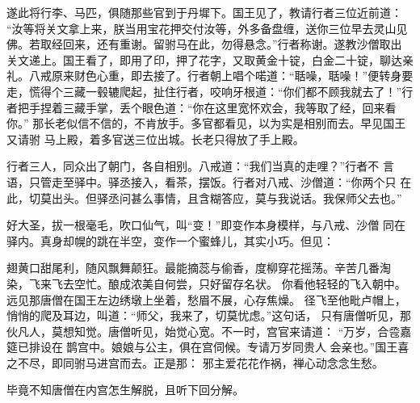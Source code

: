 遂此将行李、马匹，俱随那些官到于丹墀下。国王见了，教请行者三位近前道：
“汝等将关文拿上来，朕当用宝花押交付汝等，外多备盘缠，送你三位早去灵山见
佛。若取经回来，还有重谢。留驸马在此，勿得悬念。”行者称谢。遂教沙僧取出
关文递上。国王看了，即用了印，押了花字，又取黄金十锭，白金二十锭，聊达亲
礼。八戒原来财色心重，即去接了。行者朝上唱个喏道：“聒噪，聒噪！”便转身要
走，慌得个三藏一毂辘爬起，扯住行者，咬响牙根道：“你们都不顾我就去了！”行
者把手捏着三藏手掌，丢个眼色道：“你在这里宽怀欢会，我等取了经，回来看你。”
那长老似信不信的，不肯放手。多官都看见，以为实是相别而去。早见国王又请驸
马上殿，着多官送三位出城。长老只得放了手上殿。

行者三人，同众出了朝门，各自相别。八戒道：“我们当真的走哩？”行者不
言语，只管走至驿中。驿丞接入，看茶，摆饭。行者对八戒、沙僧道：“你两个只
在此，切莫出头。但驿丞问甚么事情，且含糊答应，莫与我说话。我保师父去也。”

好大圣，拔一根毫毛，吹口仙气，叫“变！”即变作本身模样，与八戒、沙僧
同在驿内。真身却幌的跳在半空，变作一个蜜蜂儿，其实小巧。但见：

翅黄口甜尾利，随风飘舞颠狂。最能摘蕊与偷香，度柳穿花摇荡。辛苦几番淘
染，飞来飞去空忙。酿成浓美自何尝，只好留存名状。
你看他轻轻的飞入朝中。远见那唐僧在国王左边绣墩上坐着，愁眉不展，心存焦燥。
径飞至他毗卢帽上，悄悄的爬及耳边，叫道：“师父，我来了，切莫忧虑。”这句话，
只有唐僧听见，那伙凡人，莫想知觉。唐僧听见，始觉心宽。不一时，宫官来请道：
“万岁，合卺嘉筵已排设在鹊宫中。娘娘与公主，俱在宫伺候。专请万岁同贵人
会亲也。”国王喜之不尽，即同驸马进宫而去。正是那：
邪主爱花花作祸，禅心动念念生愁。

毕竟不知唐僧在内宫怎生解脱，且听下回分解。